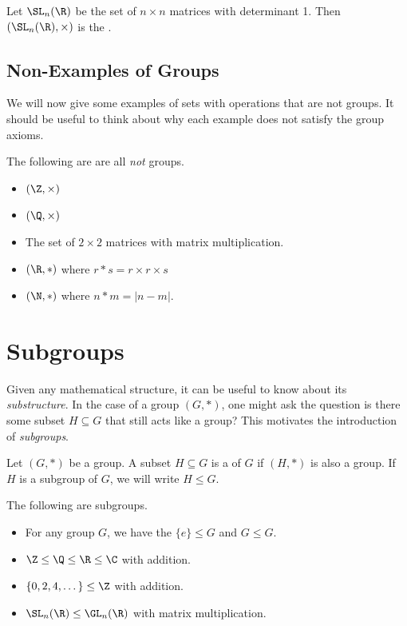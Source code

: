 \documentclass[a4]{scrreprt}
\begin{document}
\begin{example}
	Let $\SL_n(\R)$ be the set of $n \times n$ matrices with determinant 1. Then $(\SL_n(\R), \times)$ is the .
\end{example}

\subsection*{Non-Examples of Groups}

We will now give some examples of sets with operations that are not groups. It should be useful to think about why each example does not satisfy the group axioms.

\begin{example}
	The following are are all \emph{not} groups.
	\begin{itemize}
		\item $(\Z, \times)$
		\item $(\Q, \times)$
		\item The set of $2\times 2$ matrices with matrix multiplication.
		\item $(\R, *)$ where $r  * s = r\times r \times s$
		\item $(\N, *)$ where $n * m = |n - m|$.
	\end{itemize}
\end{example}

\section{Subgroups}

Given any mathematical structure, it can be useful to know about its \emph{substructure}. In the case of a group $(G, *)$, one might ask the question is there some subset $H \subseteq G$ that still acts like a group? This motivates the introduction of \emph{subgroups}.

\begin{definition}[Subgroups]
	Let $(G, *)$ be a group. A subset $H \subseteq G$ is a  of $G$ if $(H, *)$ is also a group. If $H$ is a subgroup of $G$, we will write $H \leq G$.
\end{definition}

\begin{example}
	The following are subgroups.
	\begin{itemize}
		\item For any group $G$, we have the  $\{ e \} \leq G$ and $G \leq G$.
		\item $\Z \leq \Q \leq \R \leq \C$ with addition.
		\item $\{ 0, 2, 4, \dots \} \leq \Z$ with addition.
		\item $\SL_n(\R) \leq \GL_n(\R)$ with matrix multiplication.
	\end{itemize}
\end{example}
\end{document}
